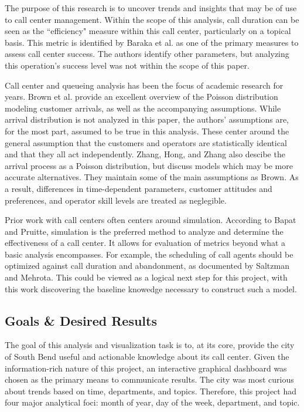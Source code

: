 \documentclass{article}
\begin{document}
The purpose of this research is to uncover trends and insights that may be of use to call center management.  Within the scope of this analysis, call duration can be seen as the ``efficiency" measure within this call center, particularly on a topical basis.  This metric is identified by Baraka et al. as one of the primary measures to assess call center success.\cite{baraka}  The authors identify other parameters, but analyzing this operation's success level was not within the scope of this paper.
\par
Call center and queueing analysis has been the focus of academic research for years.  Brown et al. provide an excellent overview of the Poisson distribution modeling customer arrivals, as well as the accompanying assumptions.  While arrival distribution is not analyzed in this paper, the authors' assumptions are, for the most part, assumed to be true in this analysis.  These center around the general assumption that the customers and operators are statistically identical and that they all act independently.\cite{brown}  Zhang, Hong, and Zhang also descibe the arrival process as a Poisson distribution, but discuss models which may be more accurate alternatives.\cite{zhang}  They maintain some of the main assumptions as Brown.  As a result, differences in time-dependent parameters, customer attitudes and preferences, and operator skill levels are treated as neglegible.
\par
Prior work with call centers often centers around simulation.  According to Bapat and Pruitte, simulation is the preferred method to analyze and determine the effectiveness of a call center.\cite{bapat}  It allows for evaluation of metrics beyond what a basic analysis encompasses.  For example, the scheduling of call agents should be optimized against call duration and abandonment, as documented by Saltzman and Mehrota.\cite{saltzman}  This could be viewed as a logical next step for this project, with this work discovering the baseline knowedge necessary to construct such a model.




	\subsection{Goals \& Desired Results}

The goal of this analysis and visualization task is to, at its core, provide the city of South Bend useful and actionable knowledge about its call center.  Given the information-rich nature of this project, an interactive graphical dashboard was chosen as the primary means to communicate results.  The city was most curious about trends based on time, departments, and topics.  Therefore, this project had four major analytical foci:  month of year, day of the week, department, and topic.
\end{document}

